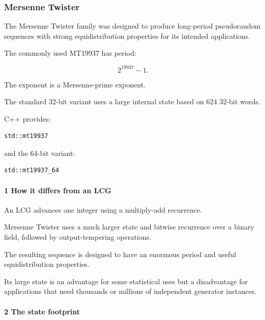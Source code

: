 \subsubsection{Mersenne Twister}\label{02-foundations-ii-ch029-mersenne-twister}

\hypertarget{02-foundations-ii-ch029-mersenne-twister}{}

The Mersenne Twister family was designed to produce long-period pseudorandom sequences with strong equidistribution properties for its intended applications.

The commonly used MT19937 has period:

\[
 \boxed{2^{19937}-1}.
\]

The exponent is a Mersenne-prime exponent.

The standard 32-bit variant uses a large internal state based on 624 32-bit words.

C++ provides:

\begin{verbatim}
std::mt19937
\end{verbatim}

and the 64-bit variant:

\begin{verbatim}
std::mt19937_64
\end{verbatim}

\paragraph{1 How it differs from an LCG}\label{02-foundations-ii-ch029-how-it-differs-from-an-lcg}

\hypertarget{02-foundations-ii-ch029-how-it-differs-from-an-lcg}{}

An LCG advances one integer using a multiply-add recurrence.

Mersenne Twister uses a much larger state and bitwise recurrence over a binary field, followed by output-tempering operations.

The resulting sequence is designed to have an enormous period and useful equidistribution properties.

Its large state is an advantage for some statistical uses but a disadvantage for applications that need thousands or millions of independent generator instances.

\paragraph{2 The state footprint}\label{02-foundations-ii-ch029-the-state-footprint}

